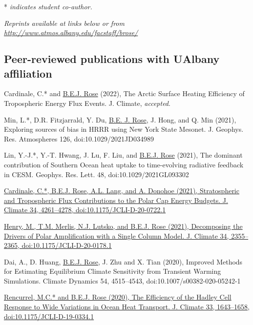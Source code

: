 \documentclass[11pt, letterpaper]{article} %
\newcommand{\years}[1]{\marginnote{\scriptsize #1}} %
\newcommand{\publink}{http://www.atmos.albany.edu/facstaff/brose/resources/Publications/}
\begin{document}
* \emph{indicates student co-author.}

\emph{Reprints available at links below or from \url{http://www.atmos.albany.edu/facstaff/brose/}}

\subsection*{Peer-reviewed publications with UAlbany affiliation}  

\years{2022}
Cardinale, C.* and \underline{B.E.J. Rose} (2022), The Arctic Surface Heating Efficiency of Tropospheric Energy Flux Events. J. Climate, \emph{accepted}.
\vspace{0.2 cm} 

\years{2021}
Min, L.*, D.R. Fitzjarrald, Y. Du, \underline{B.E. J. Rose}, J. Hong, and Q. Min (2021), Exploring sources of bias in HRRR using New York State Mesonet. J. Geophys. Res. Atmospheres 126, doi:10.1029/2021JD034989
\vspace{0.2 cm}

Lin, Y.-J.*, Y.-T. Hwang, J. Lu, F. Liu, and \underline{B.E.J. Rose} (2021), The dominant contribution of Southern Ocean heat uptake to time-evolving radiative feedback in CESM. Geophys. Res. Lett. 48, doi:10.1029/2021GL093302
\vspace{0.2 cm}

\href{\publink Cardinale_etal_JClim2021.pdf}{Cardinale, C.*, \underline{B.E.J. Rose}, A.L. Lang, and A. Donohoe (2021), Stratospheric and Tropospheric Flux Contributions to the Polar Cap Energy Budgets. J. Climate 34, 4261--4278, doi:10.1175/JCLI-D-20-0722.1}
\vspace{0.2 cm}

\href{\publink Henry_etal_JClim2021.pdf}{Henry, M., T.M. Merlis, N.J. Lutsko, and \underline{B.E.J. Rose} (2021), Decomposing the Drivers of Polar Amplification with a Single Column Model. J. Climate 34, 2355--2365, doi:10.1175/JCLI-D-20-0178.1}
\vspace{0.2 cm}

\years{2020} 
Dai, A., D. Huang, \underline{B.E.J. Rose}, J. Zhu and X. Tian (2020), Improved Methods for Estimating Equilibrium Climate Sensitivity from Transient Warming Simulations. Climate Dynamics 54, 4515--4543, doi:10.1007/s00382-020-05242-1
\vspace{0.2 cm}

\href{\publink Rencurrel_Rose_JClim2020.pdf}{Rencurrel, M.C.* and \underline{B.E.J. Rose} (2020), The Efficiency of the Hadley Cell Response to Wide Variations in Ocean Heat Transport. J. Climate 33, 1643--1658, doi:10.1175/JCLI-D-19-0334.1}
\vspace{0.2 cm}
\end{document}

